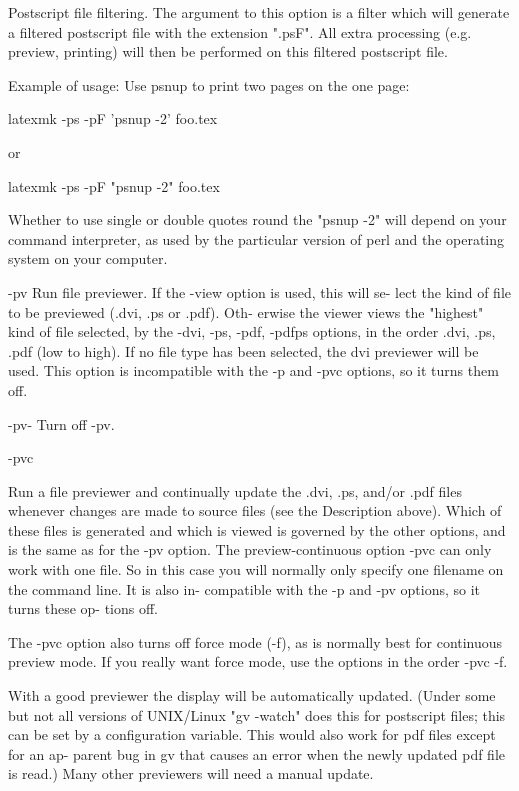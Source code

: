 Postscript  file  filtering.   The  argument to this option is a
filter which will generate a filtered postscript file  with  the
extension ".psF".  All extra processing (e.g. preview, printing)
will then be performed on this filtered postscript file.

Example of usage: Use psnup to print two pages on the one page:

latexmk -ps -pF 'psnup -2' foo.tex

or

latexmk -ps -pF "psnup -2" foo.tex

Whether to use single or double quotes round the "psnup -2" will
depend  on  your  command interpreter, as used by the particular
version of perl and the operating system on your computer.


       -pv    Run file previewer.  If the -view option is used, this will  se-
              lect the kind of file to be previewed (.dvi, .ps or .pdf).  Oth-
              erwise the viewer views the "highest" kind of file selected,  by
              the  -dvi,  -ps,  -pdf,  -pdfps options, in the order .dvi, .ps,
              .pdf (low to high).  If no file type has been selected, the  dvi
              previewer will be used.  This option is incompatible with the -p
              and -pvc options, so it turns them off.


       -pv-   Turn off -pv.


-pvc

Run a file previewer  and  continually  update  the  .dvi,  .ps,
and/or .pdf files whenever changes are made to source files (see
the Description above).  Which of these files is  generated  and
which  is  viewed  is  governed by the other options, and is the
same as for the -pv option.  The preview-continuous option  -pvc
can  only work with one file.  So in this case you will normally
only specify one filename on the command line.  It is  also  in-
compatible  with  the  -p and -pv options, so it turns these op-
tions off.

The -pvc option also turns off force mode (-f), as  is  normally
best  for  continuous  preview  mode.   If you really want force
mode, use the options in the order -pvc -f.

With a good previewer the display will be automatically updated.
(Under  some but not all versions of UNIX/Linux "gv -watch" does
this for postscript files; this can be set  by  a  configuration
variable.   This would also work for pdf files except for an ap-
parent bug in gv that causes an error when the newly updated pdf
file is read.)  Many other previewers will need a manual update.

